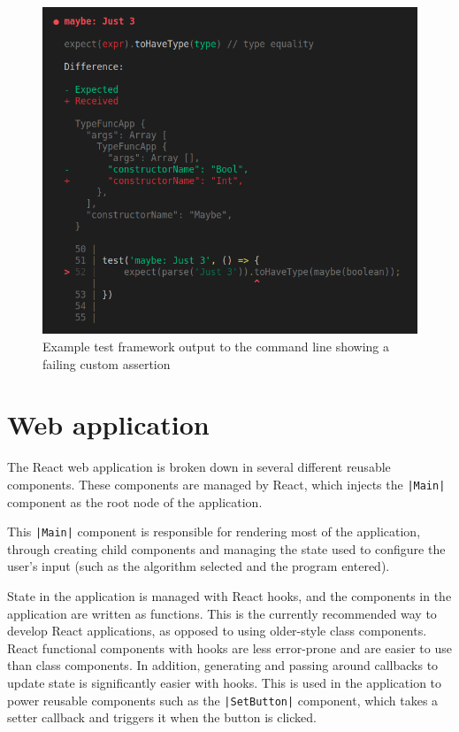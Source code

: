 \documentclass[a4paper,fleqn,twoside,12pt]{report}
\begin{document}
{\centering \begin{figure}[h!]
  \centering
  \includegraphics[width=0.769\linewidth]{images/image9.png}
  \caption{Example test framework output to the command line showing a failing custom assertion}
\end{figure} \par}
\section{Web application}\label{id:h.jqmg1n3w35mp}
The React web application is broken down in several different reusable components. These components are managed by React, which injects the \texttt{|Main|} component as the root node of the application.

This \texttt{|Main|} component is responsible for rendering most of the application, through creating child components and managing the state used to configure the user’s input (such as the algorithm selected and the program entered).

State in the application is managed with React hooks, and the components in the application are written as functions. This is the currently recommended way to develop React applications, as opposed to using older-style class components. React functional components with hooks are less error-prone and are easier to use than class components. In addition, generating and passing around callbacks to update state is significantly easier with hooks. This is used in the application to power reusable components such as the \texttt{|SetButton|} component, which takes a setter callback and triggers it when the button is clicked.
\end{document}
